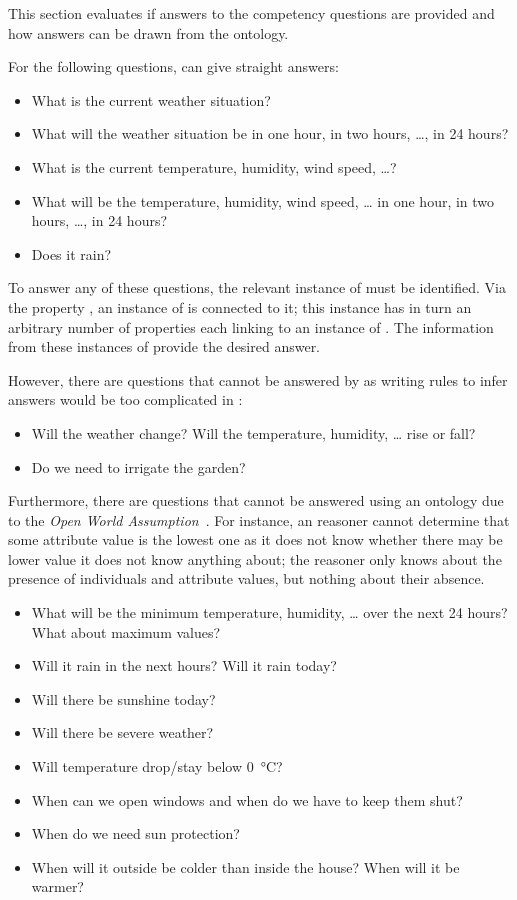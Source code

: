 This section evaluates if answers to the competency questions are provided and how answers can be drawn from the ontology.

For the following questions, \smarthomeweather can give straight answers:
\begin{itemize}
  \item What is the current weather situation?
  \item What will the weather situation be in one hour, in two hours, …, in 24 hours?
  \item What is the current temperature, humidity, wind speed, …?
  \item What will be the temperature, humidity, wind speed, … in one hour, in two hours, …, in 24 hours?
  \item Does it rain?
\end{itemize}
To answer any of these questions, the relevant instance of  must be identified. Via the property , an instance of  is connected to it; this instance has in turn an arbitrary number of  properties each linking to an instance of . The information from these instances of  provide the desired answer.

However, there are questions that cannot be answered by \smarthomeweather as writing rules to infer answers would be too complicated in :
\begin{itemize}
  \item Will the weather change? Will the temperature, humidity, … rise or fall?
  \item Do we need to irrigate the garden?
\end{itemize}

Furthermore, there are questions that cannot be answered using an  ontology due to the \emph{Open World Assumption}~\cite{open_world_assumption1}. For instance, an  reasoner cannot determine that some attribute value is the lowest one as it does not know whether there may be lower value it does not know anything about; the reasoner only knows about the presence of individuals and attribute values, but nothing about their absence.

\begin{itemize}
  \item What will be the minimum temperature, humidity, … over the next 24 hours? What about maximum values?
  \item Will it rain in the next hours? Will it rain today?
  \item Will there be sunshine today?
  \item Will there be severe weather?
  \item Will temperature drop/stay below \SI{0}{\celsius}?
  \item When can we open windows and when do we have to keep them shut?
  \item When do we need sun protection?
  \item When will it outside be colder than inside the house? When will it be warmer?
\end{itemize}

